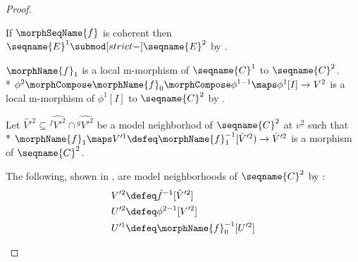 \documentclass{article}
\begin{document}
\begin{lemma}
\begin{proof}
\begin{description}
If $\morphSeqName{f}$ is coherent then
$\seqname{E}^1 \submod[strict-] \seqname{E}^2$ by
.

\item[$\seqname{C}^i$ without category:]
$\morphName{f}_1$ is a local m-morphism of $\seqname{C}^1$ to
$\seqname{C}^2$. \\*
$
  \phi^2 \morphCompose \morphName{f}_0 \morphCompose \phi^{1-1} \maps
  \phi^1[I] \to V^2
$
is a local m-morphism of $\phi^1[I]$ to $\seqname{C}^2$ by
.

Let $\hat{V}'^2 \subseteq \hat{^{f}V'^2} \cap \hat{^{g}V'^2}$ be a model
neighborhod of $\seqname{C}^2$ at $v^2$ such that \\*
$
  \morphName{f}_1 \maps V'^1 \defeq \morphName{f}_1^{-1}[\hat{V}'^2)
  \to \hat{V}'^2
$
is a morphism of $\seqname{C}^2$.

The following, shown in
{
  \showlabelsinline
  ,
}
are model
neighborhoods of $\seqname{C}^2$ by :
\begin{align*}
V'^2 & \defeq \hat{f}^{-1}[\hat{V}'^2]
\\*
U'^2 & \defeq \phi^{2-1}[V'^2]
\\*
U'^1 & \defeq \morphName{f}^{-1}_0[U'^2]
\end{align*}


\end{description}
\end{proof}
\end{lemma}
\end{document}
